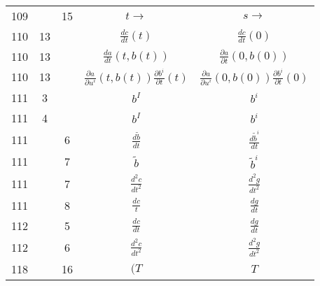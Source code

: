 \documentclass[a4paper,11pt]{article}
\numberwithin{equation}{section}
\begin{document}
\begin{center}
\begin{tabular}{|c|c|c|c|c|}
    109 & & 15 & $t \to$ & $s \to$ \\
    110 & 13 & & $\frac{ d c }{ dt }( t )$
           & $\frac{ d c }{ dt }( 0 )$ \\
    110 & 13 & & $\frac{ d a }{ dt }( t, b( t ) )$
           & $\frac{ \partial a }{ \partial t }( 0, b( 0 ) )$ \\
    110 & 13 & & $\frac{ \partial a }{ \partial u^{ i } }( t, b( t ) )
                 \frac{ \partial b^{ i } }{ \partial t }( t )$
           & $\frac{ \partial a }{ \partial u^{ i } }( 0, b( 0 ) )
             \frac{ \partial b^{ i } }{ \partial t }( 0 )$ \\
    111 & \hphantom{0}3 & & $b^{ I }$ & $b^{ i }$ \\
    111 & \hphantom{0}4 & & $b^{ I }$ & $b^{ i }$ \\
    111 & & \hphantom{0}6 & $\frac{ d \widetilde{ b } }{ dt }$
    & $\frac{ d \widetilde{ b }^{ i } }{ dt }$ \\
    111 & & \hphantom{0}7 & $\widetilde{ b }$ & $\widetilde{ b }^{ i }$ \\
    111 & & \hphantom{0}7 & $\frac{ d^{ 2 } c }{ dt^{ 2 } }$
    & $\frac{ d^{ 2 } g }{ dt^{ 2 } }$ \\
    111 & & \hphantom{0}8 & $\frac{ d c }{ t }$ & $\frac{ d g }{ dt }$ \\
    112 & & \hphantom{0}5 & $\frac{ d c }{ dt }$ & $\frac{ d g }{ dt }$ \\
    112 & & \hphantom{0}6 & $\frac{ d^{ 2 } c }{ dt^{ 2 } }$
           & $\frac{ d^{ 2 } g }{ dt^{ 2 } }$ \\
    118 & & 16 & $( T$ & $T$ \\
    \hline
  \end{tabular}





  \newpage


\end{center}
\end{document}
